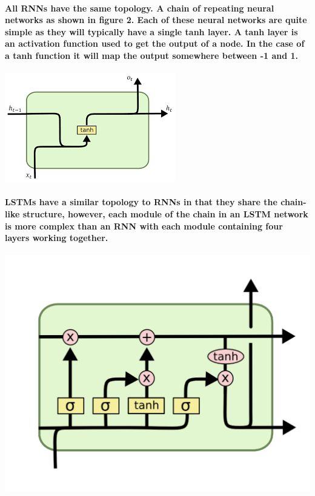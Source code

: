 \paragraph{All RNNs have the same topology. A chain of repeating neural networks as shown in figure 2. Each of these neural networks are quite simple as they will typically have a single tanh layer. A tanh layer is an activation function used to get the output of a node. In the case of a tanh function it will map the output somewhere between -1 and 1. }

\begin{center}
    \includegraphics[scale=0.75]{img/RNN_single.png}
\end{center}

\paragraph{LSTMs have a similar topology to RNNs in that they share the chain-like structure, however, each module of the chain in an LSTM network is more complex than an RNN with each module containing four layers working together.}

\begin{center}
    \includegraphics[scale=0.4]{img/LSTM_single.png}
\end{center}

